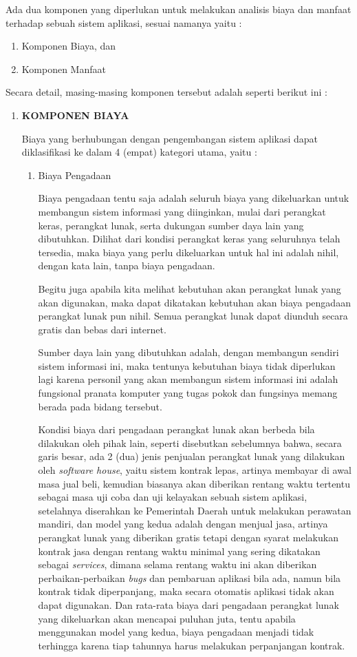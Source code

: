 \documentclass[pdftex,12pt, oneside]{article}
\begin{document}
Ada dua komponen yang diperlukan untuk melakukan analisis biaya dan manfaat terhadap sebuah sistem aplikasi, sesuai namanya yaitu :

\begin{enumerate}
	\item Komponen Biaya, dan
	\item Komponen Manfaat
\end{enumerate}

Secara detail, masing-masing komponen tersebut adalah seperti berikut ini :

\begin{enumerate}
	\item \textbf{KOMPONEN BIAYA}
	
Biaya yang berhubungan dengan pengembangan sistem aplikasi dapat diklasifikasi ke dalam 4 (empat) kategori utama, yaitu :

\begin{enumerate}
	\item Biaya Pengadaan
	
Biaya pengadaan tentu saja adalah seluruh biaya yang dikeluarkan untuk membangun sistem informasi yang diinginkan, mulai dari perangkat keras, perangkat lunak, serta dukungan sumber daya lain yang dibutuhkan. Dilihat dari kondisi perangkat keras yang seluruhnya telah tersedia, maka biaya yang perlu dikeluarkan untuk hal ini adalah nihil, dengan kata lain, tanpa biaya pengadaan.

Begitu juga apabila kita melihat kebutuhan akan perangkat lunak yang akan digunakan, maka dapat dikatakan kebutuhan akan biaya pengadaan perangkat lunak pun nihil. Semua perangkat lunak dapat diunduh secara gratis dan bebas dari internet.

Sumber daya lain yang dibutuhkan adalah, dengan membangun sendiri sistem informasi ini, maka tentunya kebutuhan biaya tidak diperlukan lagi karena personil yang akan membangun sistem informasi ini adalah fungsional pranata komputer yang tugas pokok dan fungsinya memang berada pada bidang tersebut.

Kondisi biaya dari pengadaan perangkat lunak akan berbeda bila dilakukan oleh pihak lain, seperti disebutkan sebelumnya bahwa, secara garis besar, ada 2 (dua) jenis penjualan perangkat lunak yang dilakukan oleh \textit{software house}, yaitu sistem kontrak lepas, artinya membayar di awal masa jual beli, kemudian biasanya akan diberikan rentang waktu tertentu sebagai masa uji coba dan uji kelayakan sebuah sistem aplikasi, setelahnya diserahkan ke Pemerintah Daerah untuk melakukan perawatan mandiri, dan model yang kedua adalah dengan menjual jasa, artinya perangkat lunak yang diberikan gratis tetapi dengan syarat melakukan kontrak jasa dengan rentang waktu minimal yang sering dikatakan sebagai \textit{services}, dimana selama rentang waktu ini akan diberikan perbaikan-perbaikan \textit{bugs} dan pembaruan aplikasi bila ada, namun bila kontrak tidak diperpanjang, maka secara otomatis aplikasi tidak akan dapat digunakan. Dan rata-rata biaya dari pengadaan perangkat lunak yang dikeluarkan akan mencapai puluhan juta, tentu apabila menggunakan model yang kedua, biaya pengadaan menjadi tidak terhingga karena tiap tahunnya harus melakukan perpanjangan kontrak.	
	

\end{enumerate}
\end{enumerate}
\end{document}

